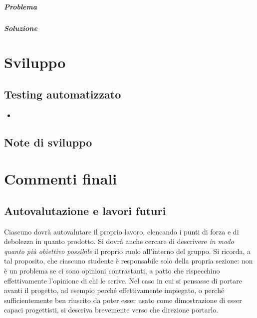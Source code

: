 \documentclass[a4paper,12pt]{report}
\begin{document}
\paragraph{Problema} %
\paragraph{Soluzione} %
%


\chapter{Sviluppo}
\section{Testing automatizzato}

\begin{itemize}
	\item 

\end{itemize}


\section{Note di sviluppo}


\chapter{Commenti finali}


\section{Autovalutazione e lavori futuri}

%
Ciascuno dovrà autovalutare il proprio lavoro, elencando i punti di forza e di debolezza in quanto prodotto.
Si dovrà anche cercare di descrivere \emph{in modo quanto più obiettivo possibile} il proprio ruolo all'interno del gruppo.
Si ricorda, a tal proposito, che ciascuno studente è responsabile solo della propria sezione: non è un problema se ci sono opinioni contrastanti, a patto che rispecchino effettivamente l'opinione di chi le scrive.
Nel caso in cui si pensasse di portare avanti il progetto, ad esempio perché effettivamente impiegato, o perché sufficientemente ben riuscito da poter esser usato come dimostrazione di esser capaci progettisti, si descriva brevemente verso che direzione portarlo.
\end{document}
